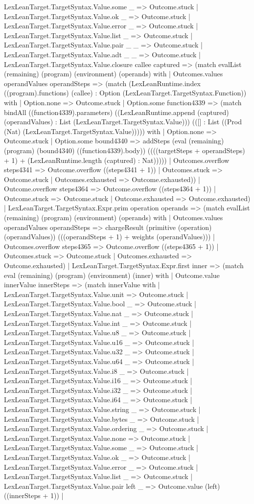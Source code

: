 \documentclass[11pt]{article}
\begin{document}
LexLeanTarget.TargetSyntax.Value.some \_ => Outcome.stuck | LexLeanTarget.TargetSyntax.Value.ok \_ => Outcome.stuck | LexLeanTarget.TargetSyntax.Value.error \_ => Outcome.stuck | LexLeanTarget.TargetSyntax.Value.list \_ => Outcome.stuck | LexLeanTarget.TargetSyntax.Value.pair \_ \_ => Outcome.stuck | LexLeanTarget.TargetSyntax.Value.adt \_ \_ => Outcome.stuck | LexLeanTarget.TargetSyntax.Value.closure callee captured => (match evalList (remaining) (program) (environment) (operands) with | Outcomes.values operandValues operandSteps => (match (LexLeanRuntime.index ((program).functions) (callee) : Option (LexLeanTarget.TargetSyntax.Function)) with | Option.none => Outcome.stuck | Option.some function4339 => (match bindAll ((function4339).parameters) ((LexLeanRuntime.append (captured) (operandValues) : List (LexLeanTarget.TargetSyntax.Value))) (([] : List ((Prod (Nat) (LexLeanTarget.TargetSyntax.Value))))) with | Option.none => Outcome.stuck | Option.some bound4340 => addSteps (eval (remaining) (program) (bound4340) ((function4339).body)) ((((targetSteps + operandSteps) + 1) + (LexLeanRuntime.length (captured) : Nat))))) | Outcomes.overflow steps4341 => Outcome.overflow ((steps4341 + 1)) | Outcomes.stuck => Outcome.stuck | Outcomes.exhausted => Outcome.exhausted)) | Outcome.overflow steps4364 => Outcome.overflow ((steps4364 + 1)) | Outcome.stuck => Outcome.stuck | Outcome.exhausted => Outcome.exhausted) | LexLeanTarget.TargetSyntax.Expr.prim operation operands => (match evalList (remaining) (program) (environment) (operands) with | Outcomes.values operandValues operandSteps => chargeResult (primitive (operation) (operandValues)) (((operandSteps + 1) + weights (operandValues))) | Outcomes.overflow steps4365 => Outcome.overflow ((steps4365 + 1)) | Outcomes.stuck => Outcome.stuck | Outcomes.exhausted => Outcome.exhausted) | LexLeanTarget.TargetSyntax.Expr.first inner => (match eval (remaining) (program) (environment) (inner) with | Outcome.value innerValue innerSteps => (match innerValue with | LexLeanTarget.TargetSyntax.Value.unit => Outcome.stuck | LexLeanTarget.TargetSyntax.Value.bool \_ => Outcome.stuck | LexLeanTarget.TargetSyntax.Value.nat \_ => Outcome.stuck | LexLeanTarget.TargetSyntax.Value.int \_ => Outcome.stuck | LexLeanTarget.TargetSyntax.Value.u8 \_ => Outcome.stuck | LexLeanTarget.TargetSyntax.Value.u16 \_ => Outcome.stuck | LexLeanTarget.TargetSyntax.Value.u32 \_ => Outcome.stuck | LexLeanTarget.TargetSyntax.Value.u64 \_ => Outcome.stuck | LexLeanTarget.TargetSyntax.Value.i8 \_ => Outcome.stuck | LexLeanTarget.TargetSyntax.Value.i16 \_ => Outcome.stuck | LexLeanTarget.TargetSyntax.Value.i32 \_ => Outcome.stuck | LexLeanTarget.TargetSyntax.Value.i64 \_ => Outcome.stuck | LexLeanTarget.TargetSyntax.Value.string \_ => Outcome.stuck | LexLeanTarget.TargetSyntax.Value.bytes \_ => Outcome.stuck | LexLeanTarget.TargetSyntax.Value.ordering \_ => Outcome.stuck | LexLeanTarget.TargetSyntax.Value.none => Outcome.stuck | LexLeanTarget.TargetSyntax.Value.some \_ => Outcome.stuck | LexLeanTarget.TargetSyntax.Value.ok \_ => Outcome.stuck | LexLeanTarget.TargetSyntax.Value.error \_ => Outcome.stuck | LexLeanTarget.TargetSyntax.Value.list \_ => Outcome.stuck | LexLeanTarget.TargetSyntax.Value.pair left \_ => Outcome.value (left) ((innerSteps + 1)) | 
\end{document}
